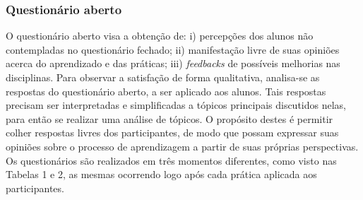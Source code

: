 \subsubsection{Questionário aberto}
O questionário aberto visa a obtenção de: i) percepções dos alunos não contempladas no questionário fechado; ii) manifestação livre de suas opiniões acerca do aprendizado e das práticas; iii) \textit{feedbacks} de possíveis melhorias nas disciplinas. Para observar a satisfação de forma qualitativa, analisa-se as respostas do questionário aberto, a ser aplicado aos alunos. Tais respostas precisam ser interpretadas e simplificadas a tópicos principais discutidos nelas, para então se realizar uma análise de tópicos. O propósito destes é permitir colher respostas livres dos participantes, de modo que possam expressar suas opiniões sobre o processo de aprendizagem a partir de suas próprias perspectivas. Os questionários são realizados em três momentos diferentes, como visto nas Tabelas 1 e 2, as mesmas ocorrendo logo após cada prática aplicada aos participantes. 

